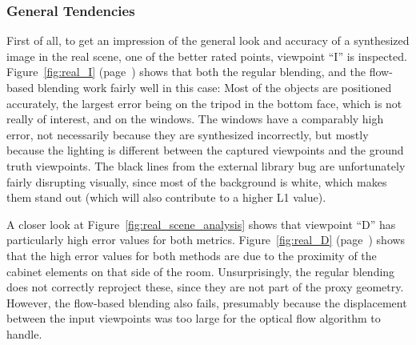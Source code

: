\subsubsection{General Tendencies}
First of all, to get an impression of the general look and accuracy of a synthesized image in the real scene, one of the better rated points, viewpoint ``I'' is inspected. Figure~\ref{fig:real_I} (page~\pageref{fig:real_I}) shows that both the regular blending, and the flow-based blending work fairly well in this case: Most of the objects are positioned accurately, the largest error being on the tripod in the bottom face, which is not really of interest, and on the windows. The windows have a comparably high error, not necessarily because they are synthesized incorrectly, but mostly because the lighting is different between the captured viewpoints and the ground truth viewpoints\footnotemark. The black lines from the external library bug are unfortunately fairly disrupting visually, since most of the background is white, which makes them stand out (which will also contribute to a higher L1 value).

A closer look at Figure~\ref{fig:real_scene_analysis} shows that viewpoint ``D'' has particularly high error values for both metrics. Figure~\ref{fig:real_D} (page~\pageref{fig:real_D}) shows that the high error values for both methods are due to the proximity of the cabinet elements on that side of the room. Unsurprisingly, the regular blending does not correctly reproject these, since they are not part of the proxy geometry. However, the flow-based blending also fails, presumably because the displacement between the input viewpoints was too large for the optical flow algorithm to handle.


